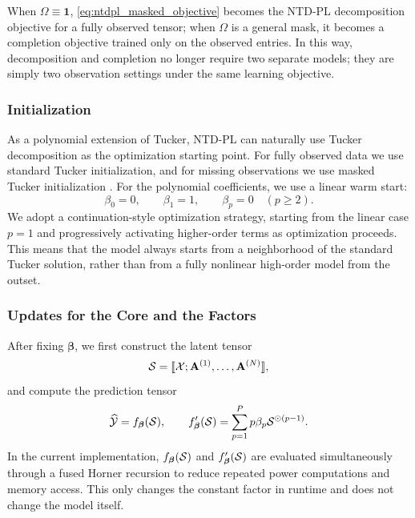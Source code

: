 When $\Omega\equiv \mathbf 1$, \eqref{eq:ntdpl_masked_objective} becomes the NTD-PL decomposition objective for a fully observed tensor; when $\Omega$ is a general mask, it becomes a completion objective trained only on the observed entries. In this way, decomposition and completion no longer require two separate models; they are simply two observation settings under the same learning objective.

\subsubsection{Initialization}

As a polynomial extension of Tucker, NTD-PL can naturally use Tucker decomposition as the optimization starting point. For fully observed data we use standard Tucker initialization, and for missing observations we use masked Tucker initialization \cite{yang2016iterative, liu2012tensor}. For the polynomial coefficients, we use a linear warm start:
\begin{equation}
\beta_0=0,\qquad \beta_1=1,\qquad \beta_p=0\quad (p\ge 2).
\label{eq:beta_warm_start}
\end{equation}
We adopt a continuation-style optimization strategy, starting from the linear case $p=1$ and progressively activating higher-order terms as optimization proceeds. This means that the model always starts from a neighborhood of the standard Tucker solution, rather than from a fully nonlinear high-order model from the outset.

\subsubsection{Updates for the Core and the Factors}

After fixing $\boldsymbol\beta$, we first construct the latent tensor
\begin{equation}
\mathcal{S} = \llbracket \mathcal{X};\mathbf A^{(1)},\dots,\mathbf A^{(N)}\rrbracket,
\end{equation}
and compute the prediction tensor
\begin{equation}
\widehat{\mathcal{Y}}=f_{\boldsymbol\beta}(\mathcal{S}),
\qquad
f_{\boldsymbol\beta}'(\mathcal{S})=\sum_{p=1}^{P} p\beta_p\mathcal{S}^{\odot(p-1)}.
\label{eq:poly_derivative_tensor}
\end{equation}
In the current implementation, $f_{\boldsymbol\beta}(\mathcal{S})$ and $f_{\boldsymbol\beta}'(\mathcal{S})$ are evaluated simultaneously through a fused Horner recursion to reduce repeated power computations and memory access. This only changes the constant factor in runtime and does not change the model itself.

